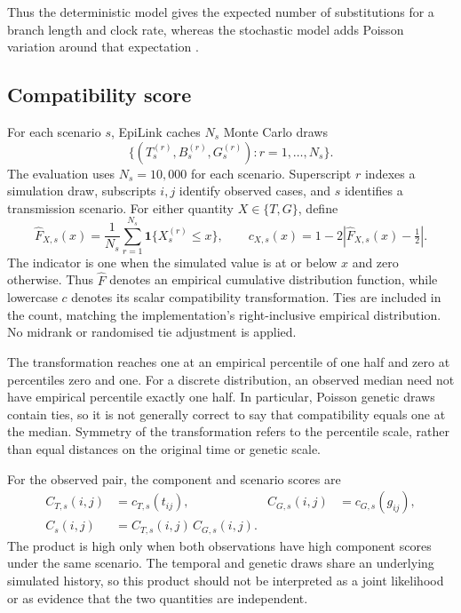 Thus the deterministic model gives the expected number of substitutions for a branch length and clock rate, whereas the stochastic model adds Poisson variation around that expectation \citep{Jombart2010}.

\subsection{Compatibility score}\label{sec:app_ch3_compatibility_score}

For each scenario $s$, EpiLink caches $N_s$ Monte Carlo draws
\[
    \bigl\{(T_s^{(r)},B_s^{(r)},G_s^{(r)}):r=1,\ldots,N_s\bigr\}.
\]
The evaluation uses $N_s=10{,}000$ for each scenario. Superscript $r$ indexes a simulation draw, subscripts $i,j$ identify observed cases, and $s$ identifies a transmission scenario. For either quantity $X\in\{T,G\}$, define
\[
    \widehat F_{X,s}(x)
    =\frac{1}{N_s}\sum_{r=1}^{N_s}\mathbf{1}\{X_s^{(r)}\le x\},
    \qquad
    c_{X,s}(x)=1-2\left|\widehat F_{X,s}(x)-\tfrac{1}{2}\right|.
\]
The indicator is one when the simulated value is at or below $x$ and zero otherwise. Thus $\widehat F$ denotes an empirical cumulative distribution function, while lowercase $c$ denotes its scalar compatibility transformation. Ties are included in the count, matching the implementation's right-inclusive empirical distribution. No midrank or randomised tie adjustment is applied.

The transformation reaches one at an empirical percentile of one half and zero at percentiles zero and one. For a discrete distribution, an observed median need not have empirical percentile exactly one half. In particular, Poisson genetic draws contain ties, so it is not generally correct to say that compatibility equals one at the median. Symmetry of the transformation refers to the percentile scale, rather than equal distances on the original time or genetic scale.

For the observed pair, the component and scenario scores are
\begin{align*}
    C_{T,s}(i,j)&=c_{T,s}(t_{ij}), &
    C_{G,s}(i,j)&=c_{G,s}(g_{ij}),\\
    C_s(i,j)&=C_{T,s}(i,j)\,C_{G,s}(i,j).
\end{align*}
The product is high only when both observations have high component scores under the same scenario. The temporal and genetic draws share an underlying simulated history, so this product should not be interpreted as a joint likelihood or as evidence that the two quantities are independent.


